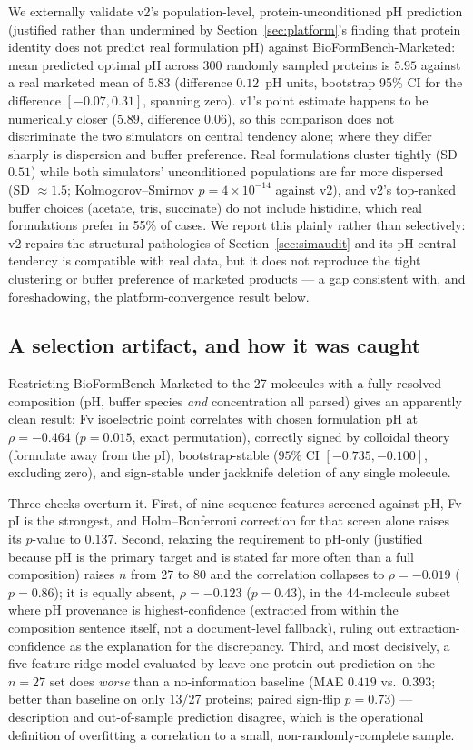 \documentclass[twocolumn,10pt]{article}
\begin{document}
We externally validate v2's population-level, protein-unconditioned pH
prediction (justified rather than undermined by Section~\ref{sec:platform}'s
finding that protein identity does not predict real formulation pH) against
BioFormBench-Marketed: mean predicted optimal pH across 300 randomly sampled
proteins is $5.95$ against a real marketed mean of $5.83$ (difference $0.12$~pH
units, bootstrap 95\% CI for the difference $[-0.07, 0.31]$, spanning zero). v1's
point estimate happens to be numerically closer ($5.89$, difference $0.06$), so
this comparison does not discriminate the two simulators on central tendency
alone; where they differ sharply is dispersion and buffer preference. Real
formulations cluster tightly (SD $0.51$) while both simulators' unconditioned
populations are far more dispersed (SD $\approx 1.5$; Kolmogorov--Smirnov
$p = 4\times10^{-14}$ against v2), and v2's top-ranked buffer choices (acetate,
tris, succinate) do not include histidine, which real formulations prefer in
55\% of cases. We report this plainly rather than selectively: v2 repairs the
structural pathologies of Section~\ref{sec:simaudit} and its pH central tendency
is compatible with real data, but it does not reproduce the tight clustering or
buffer preference of marketed products --- a gap consistent with, and
foreshadowing, the platform-convergence result below.

\subsection{A selection artifact, and how it was caught}
\label{sec:selection}

Restricting BioFormBench-Marketed to the 27 molecules with a fully resolved
composition (pH, buffer species \emph{and} concentration all parsed) gives an
apparently clean result: Fv isoelectric point correlates with chosen formulation
pH at $\rho = -0.464$ ($p = 0.015$, exact permutation), correctly signed by
colloidal theory (formulate away from the pI), bootstrap-stable
($95\%$ CI $[-0.735, -0.100]$, excluding zero), and sign-stable under jackknife
deletion of any single molecule.

Three checks overturn it. First, of nine sequence features screened against pH,
Fv pI is the strongest, and Holm--Bonferroni correction for that screen alone
raises its $p$-value to $0.137$. Second, relaxing the requirement to pH-only
(justified because pH is the primary target and is stated far more often than a
full composition) raises $n$ from 27 to 80 and the correlation collapses to
$\rho = -0.019$ ($p = 0.86$); it is equally absent, $\rho = -0.123$
($p = 0.43$), in the 44-molecule subset where pH provenance is highest-confidence
(extracted from within the composition sentence itself, not a document-level
fallback), ruling out extraction-confidence as the explanation for the
discrepancy. Third, and most decisively, a five-feature ridge model evaluated by
leave-one-protein-out prediction on the $n=27$ set does \emph{worse} than a
no-information baseline (MAE $0.419$ vs.\ $0.393$; better than baseline on only
13/27 proteins; paired sign-flip $p = 0.73$) --- description and out-of-sample
prediction disagree, which is the operational definition of overfitting a
correlation to a small, non-randomly-complete sample.
\end{document}
